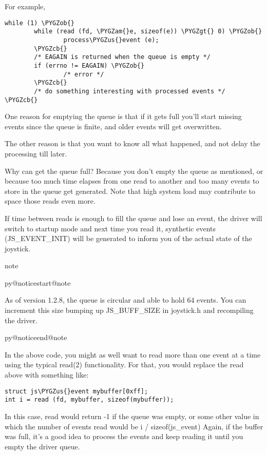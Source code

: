 \documentclass[a4paper,8pt,english]{sphinxmanual}
\makeatletter
\renewenvironment{notice}[2]{%
          \def\py@noticetype{#1}
          \begin{coloredbox}{#1}
          \bf\it
          \par\strong{#2}
          \csname py@noticestart@#1\endcsname
        }
	{
          \csname py@noticeend@\py@noticetype\endcsname
          \end{coloredbox}
        }
\def\PYGZus{\char`\_}
\def\PYGZob{\char`\{}
\def\PYGZcb{\char`\}}
\def\PYGZam{\char`\&}
\def\PYGZgt{\char`\>}
\makeatother
\begin{document}
For example,

\begin{Verbatim}[commandchars=\\\{\}]
while (1) \PYGZob{}
        while (read (fd, \PYGZam{}e, sizeof(e)) \PYGZgt{} 0) \PYGZob{}
                process\PYGZus{}event (e);
        \PYGZcb{}
        /* EAGAIN is returned when the queue is empty */
        if (errno != EAGAIN) \PYGZob{}
                /* error */
        \PYGZcb{}
        /* do something interesting with processed events */
\PYGZcb{}
\end{Verbatim}

One reason for emptying the queue is that if it gets full you'll start
missing events since the queue is finite, and older events will get
overwritten.

The other reason is that you want to know all what happened, and not
delay the processing till later.

Why can get the queue full? Because you don't empty the queue as
mentioned, or because too much time elapses from one read to another
and too many events to store in the queue get generated. Note that
high system load may contribute to space those reads even more.

If time between reads is enough to fill the queue and lose an event,
the driver will switch to startup mode and next time you read it,
synthetic events (JS\_EVENT\_INIT) will be generated to inform you of
the actual state of the joystick.

\begin{notice}{note}{Note:}
As of version 1.2.8, the queue is circular and able to hold 64
events. You can increment this size bumping up JS\_BUFF\_SIZE in
joystick.h and recompiling the driver.
\end{notice}

In the above code, you might as well want to read more than one event
at a time using the typical read(2) functionality. For that, you would
replace the read above with something like:

\begin{Verbatim}[commandchars=\\\{\}]
struct js\PYGZus{}event mybuffer[0xff];
int i = read (fd, mybuffer, sizeof(mybuffer));
\end{Verbatim}

In this case, read would return -1 if the queue was empty, or some
other value in which the number of events read would be i /
sizeof(js\_event)  Again, if the buffer was full, it's a good idea to
process the events and keep reading it until you empty the driver queue.
\end{document}
